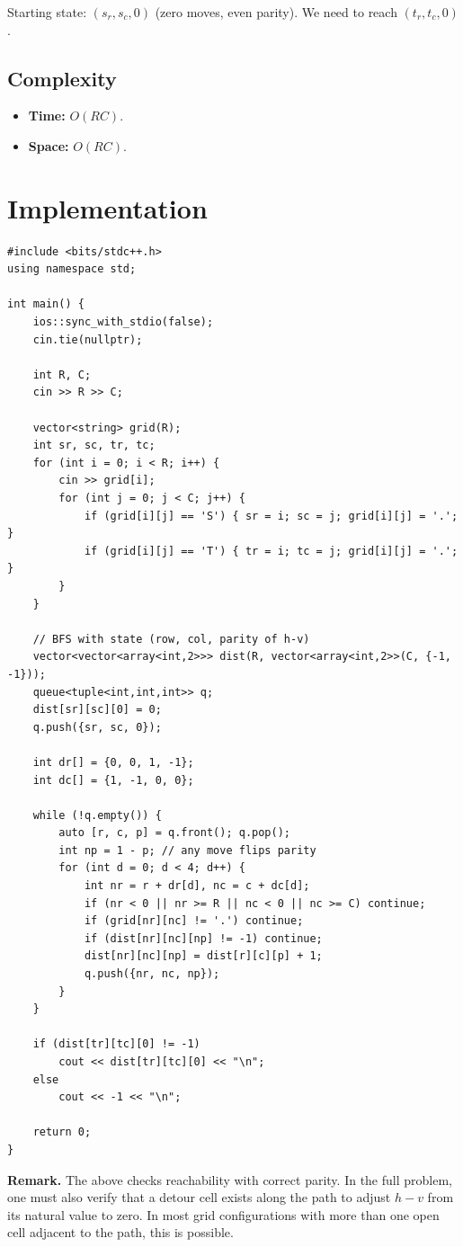 \documentclass[11pt,a4paper]{article}
\begin{document}
Starting state: $(s_r, s_c, 0)$ (zero moves, even parity). We need to reach $(t_r, t_c, 0)$.

\subsection{Complexity}
\begin{itemize}
    \item \textbf{Time:} $O(RC)$.
    \item \textbf{Space:} $O(RC)$.
\end{itemize}

\section{Implementation}

\begin{lstlisting}
#include <bits/stdc++.h>
using namespace std;

int main() {
    ios::sync_with_stdio(false);
    cin.tie(nullptr);

    int R, C;
    cin >> R >> C;

    vector<string> grid(R);
    int sr, sc, tr, tc;
    for (int i = 0; i < R; i++) {
        cin >> grid[i];
        for (int j = 0; j < C; j++) {
            if (grid[i][j] == 'S') { sr = i; sc = j; grid[i][j] = '.'; }
            if (grid[i][j] == 'T') { tr = i; tc = j; grid[i][j] = '.'; }
        }
    }

    // BFS with state (row, col, parity of h-v)
    vector<vector<array<int,2>>> dist(R, vector<array<int,2>>(C, {-1, -1}));
    queue<tuple<int,int,int>> q;
    dist[sr][sc][0] = 0;
    q.push({sr, sc, 0});

    int dr[] = {0, 0, 1, -1};
    int dc[] = {1, -1, 0, 0};

    while (!q.empty()) {
        auto [r, c, p] = q.front(); q.pop();
        int np = 1 - p; // any move flips parity
        for (int d = 0; d < 4; d++) {
            int nr = r + dr[d], nc = c + dc[d];
            if (nr < 0 || nr >= R || nc < 0 || nc >= C) continue;
            if (grid[nr][nc] != '.') continue;
            if (dist[nr][nc][np] != -1) continue;
            dist[nr][nc][np] = dist[r][c][p] + 1;
            q.push({nr, nc, np});
        }
    }

    if (dist[tr][tc][0] != -1)
        cout << dist[tr][tc][0] << "\n";
    else
        cout << -1 << "\n";

    return 0;
}
\end{lstlisting}

\textbf{Remark.} The above checks reachability with correct parity. In the full problem, one must also verify that a detour cell exists along the path to adjust $h - v$ from its natural value to zero. In most grid configurations with more than one open cell adjacent to the path, this is possible.
\end{document}
